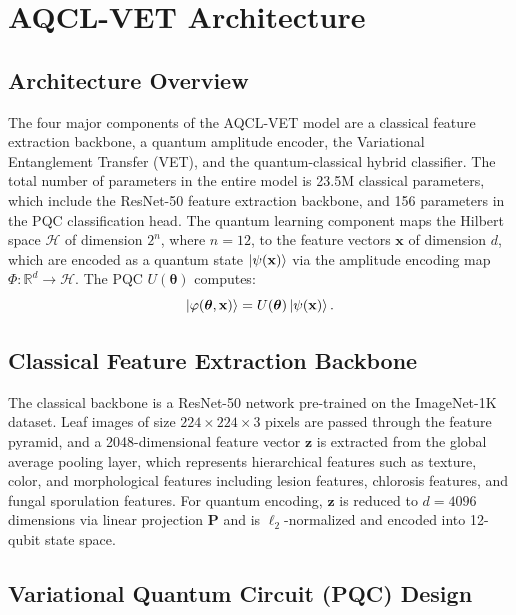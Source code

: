 \documentclass[conference]{IEEEtran}
\begin{document}
\section{AQCL-VET Architecture}
\label{sec:arch}

\subsection{Architecture Overview}

The four major components of the AQCL-VET model are a classical feature extraction backbone, a quantum amplitude encoder, the Variational Entanglement Transfer (VET), and the quantum-classical hybrid classifier. The total number of parameters in the entire model is 23.5M classical parameters, which include the ResNet-50 feature extraction backbone, and 156 parameters in the PQC classification head. The quantum learning component maps the Hilbert space $\mathcal{H}$ of dimension $2^n$, where $n = 12$, to the feature vectors $\mathbf{x}$ of dimension $d$, which are encoded as a quantum state $\ket{\psi(\mathbf{x})}$ via the amplitude encoding map $\Phi: \mathbb{R}^d \rightarrow \mathcal{H}$. The PQC $U(\boldsymbol{\theta})$ computes:
\begin{equation}
  \ket{\varphi(\boldsymbol{\theta}, \mathbf{x})} = U(\boldsymbol{\theta})\ket{\psi(\mathbf{x})}.
\end{equation}

\subsection{Classical Feature Extraction Backbone}

The classical backbone is a ResNet-50 network pre-trained on the ImageNet-1K dataset. Leaf images of size $224\times224\times3$ pixels are passed through the feature pyramid, and a 2048-dimensional feature vector $\mathbf{z}$ is extracted from the global average pooling layer, which represents hierarchical features such as texture, color, and morphological features including lesion features, chlorosis features, and fungal sporulation features. For quantum encoding, $\mathbf{z}$ is reduced to $d = 4096$ dimensions via linear projection $\mathbf{P}$ and is $\ell_2$-normalized and encoded into 12-qubit state space.

\subsection{Variational Quantum Circuit (PQC) Design}
\end{document}
